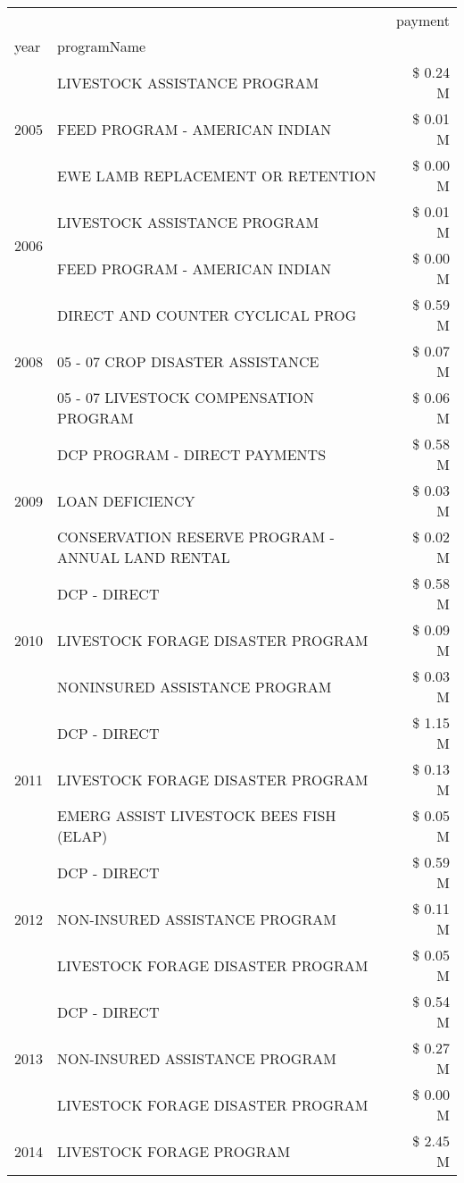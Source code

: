 \begin{tabular}{llr}
\toprule
 &  & payment \\
year & programName &  \\
\midrule
\multirow[t]{3}{*}{2005} & LIVESTOCK ASSISTANCE PROGRAM & \$ 0.24 M \\
 & FEED PROGRAM - AMERICAN INDIAN & \$ 0.01 M \\
 & EWE LAMB REPLACEMENT OR RETENTION & \$ 0.00 M \\
\cline{1-3}
\multirow[t]{2}{*}{2006} & LIVESTOCK ASSISTANCE PROGRAM & \$ 0.01 M \\
 & FEED PROGRAM - AMERICAN INDIAN & \$ 0.00 M \\
\cline{1-3}
\multirow[t]{3}{*}{2008} & DIRECT AND COUNTER CYCLICAL PROG & \$ 0.59 M \\
 & 05 - 07 CROP DISASTER ASSISTANCE & \$ 0.07 M \\
 & 05 - 07 LIVESTOCK COMPENSATION PROGRAM & \$ 0.06 M \\
\cline{1-3}
\multirow[t]{3}{*}{2009} & DCP PROGRAM - DIRECT PAYMENTS & \$ 0.58 M \\
 & LOAN DEFICIENCY & \$ 0.03 M \\
 & CONSERVATION RESERVE PROGRAM - ANNUAL LAND RENTAL & \$ 0.02 M \\
\cline{1-3}
\multirow[t]{3}{*}{2010} & DCP - DIRECT & \$ 0.58 M \\
 & LIVESTOCK FORAGE DISASTER PROGRAM & \$ 0.09 M \\
 & NONINSURED ASSISTANCE PROGRAM & \$ 0.03 M \\
\cline{1-3}
\multirow[t]{3}{*}{2011} & DCP - DIRECT & \$ 1.15 M \\
 & LIVESTOCK FORAGE DISASTER PROGRAM & \$ 0.13 M \\
 & EMERG ASSIST LIVESTOCK BEES FISH (ELAP) & \$ 0.05 M \\
\cline{1-3}
\multirow[t]{3}{*}{2012} & DCP - DIRECT & \$ 0.59 M \\
 & NON-INSURED ASSISTANCE PROGRAM & \$ 0.11 M \\
 & LIVESTOCK FORAGE DISASTER PROGRAM & \$ 0.05 M \\
\cline{1-3}
\multirow[t]{3}{*}{2013} & DCP - DIRECT & \$ 0.54 M \\
 & NON-INSURED ASSISTANCE PROGRAM & \$ 0.27 M \\
 & LIVESTOCK FORAGE DISASTER PROGRAM & \$ 0.00 M \\
\cline{1-3}
\multirow[t]{3}{*}{2014} & LIVESTOCK FORAGE PROGRAM & \$ 2.45 M \\

\end{tabular}
